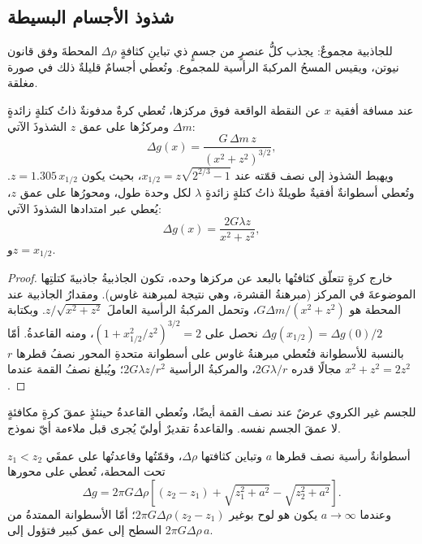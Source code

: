 \subsection{شذوذ الأجسام البسيطة}

 للجاذبية مجموعٌ: يجذب كلُّ عنصرٍ من جسمٍ ذي
تباينِ كثافةٍ $\Delta\rho$ المحطةَ وفق قانون نيوتن، ويقيس المسحُ
المركبةَ الرأسية للمجموع. وتُعطي أجسامٌ قليلةٌ
ذلك في صورة مغلقة.

\begin{theorem}\label{thm:b3:field-lab-methods-3:sphere}
عند مسافة أفقية $x$ عن النقطة الواقعة فوق مركزها، تُعطي كرةٌ مدفونةٌ
ذاتُ كتلةٍ زائدةٍ $\Delta m$ ومركزُها على عمق $z$
الشذوذَ الآتي:
\[
\Delta g(x) = \frac{G\,\Delta m\,z}{(x^2 + z^2)^{3/2}} ,
\]
ويهبط الشذوذ إلى نصف قمّته عند $x_{1/2} = z\sqrt{2^{2/3} - 1}$،
بحيث يكون $z = 1.305\,x_{1/2}$. وتُعطي أسطوانةٌ أفقيةٌ طويلةٌ ذاتُ كتلةٍ زائدةٍ
$\lambda$ لكل وحدة طول، ومحورُها على عمق $z$، يُعطي عبر
امتدادها الشذوذَ الآتي:
\[
\Delta g(x) = \frac{2G\lambda z}{x^2 + z^2} ,
\]
و$z = x_{1/2}$.
\end{theorem}

\begin{proof}
خارج كرةٍ تتعلّق كثافتُها بالبعد عن مركزها وحده،
تكون الجاذبيةُ جاذبيةَ كتلتِها الموضوعةَ في المركز (مبرهنةُ
القشرة، وهي نتيجة لمبرهنة غاوس). ومقدارُ الجاذبية عند
المحطة هو $G\Delta m/(x^2 + z^2)$، وتحمل المركبةُ الرأسية
العاملَ $z/\sqrt{x^2 + z^2}$. وبكتابة $\Delta g(x_{1/2}) =
\Delta g(0)/2$ نحصل على $(1 + x_{1/2}^2/z^2)^{3/2} = 2$، ومنه القاعدةُ. أمّا
بالنسبة للأسطوانة فتُعطي مبرهنةُ غاوس على أسطوانة متحدةِ المحور نصفُ قطرها $r$
مجالًا قدره $2G\lambda/r$، والمركبةُ الرأسية $2G\lambda z/r^2$؛
ويُبلغ نصفُ القمة عندما $x^2 + z^2 = 2z^2$.
\end{proof}

للجسم غير الكروي عرضٌ عند نصف القمة أيضًا، وتُعطي القاعدةُ حينئذٍ
عمقَ كرةٍ مكافئةٍ لا عمقَ الجسم نفسه. والقاعدةُ
تقديرٌ أوليّ يُجرى قبل ملاءمة أيّ نموذج.

\begin{proposition}\label{prop:b3:field-lab-methods-3:vcyl}
أسطوانةٌ رأسية نصف قطرها $a$ وتباين كثافتها $\Delta\rho$،
وقمّتُها وقاعدتُها على عمقَي $z_1 < z_2$ تحت المحطة، تُعطي
على محورها
\[
\Delta g = 2\pi G\Delta\rho\left[(z_2 - z_1) + \sqrt{z_1^2 + a^2}
           - \sqrt{z_2^2 + a^2}\right] .
\]
وعندما $a \to \infty$ يكون هو لوح بوغير $2\pi G\Delta\rho(z_2 - z_1)$؛
أمّا الأسطوانة الممتدةُ من السطح إلى عمق كبير فتؤول إلى
$2\pi G\Delta\rho\,a$.
\end{proposition}


